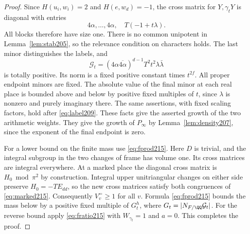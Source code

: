 \documentclass[a4paper,11pt]{article}
\theoremstyle{definition}
\theoremstyle{remark}
\numberwithin{equation}{section}
\begin{document}
\begin{proof}
Since \(H(u_i,w_i)=2\) and \(H(e,w_d)=-1\), the cross
matrix for \(Y,\gamma_tY\) is diagonal with entries
\[
                4\alpha,\ldots,4\alpha,\quad T(-1+t\lambda).
\]
All blocks therefore have size one. There is no common
unipotent in Lemma~\ref{lem:stab205}, so the relevance
condition on characters holds. The last minor distinguishes
the labels, and
\[
 \mathcal G_t
    =(4\alpha\overline{4\alpha})^{d-1}
                        T^2t^2\lambda\bar\lambda
\]
is totally positive. Its norm is a fixed positive constant
times \(t^{2f}\). All proper endpoint minors are fixed.
The absolute value of the final minor at each real place
is bounded above and below by positive fixed multiples of
\(t\), since \(\lambda\) is nonzero and purely imaginary
there. The same assertions, with fixed scaling factors, hold
after \eqref{eq:label209}. These facts give the asserted
growth of the two arithmetic weights. They give the growth of
\(P_\infty\) by Lemma~\ref{lem:density207}, since the exponent
of the final endpoint is zero.

For a lower bound on the finite mass use \eqref{eq:fprod215}.
Here \(D\) is trivial, and the integral subgroup in the two
changes of frame has volume one. Its cross matrices are integral
everywhere. At a marked place the diagonal cross matrix is
\(H_0\bmod\pi^2\) by construction. Integral upper unitriangular
changes on either side preserve \(H_0=-T E_{dd}\), so the new
cross matrices satisfy both congruences of \eqref{eq:marked215}.
Consequently \(V_v^{=}\ge1\) for all \(v\). Formula
\eqref{eq:fprod215} bounds the mass below by a positive fixed
multiple of \(G_t^h\), where \(G_t=|N_{F/\QQ}\mathcal G_t|\).
For the reverse bound apply \eqref{eq:fratio215} with
\(W_{\gamma_t}=1\) and \(a=0\). This completes the proof.
\end{proof}
\end{document}
